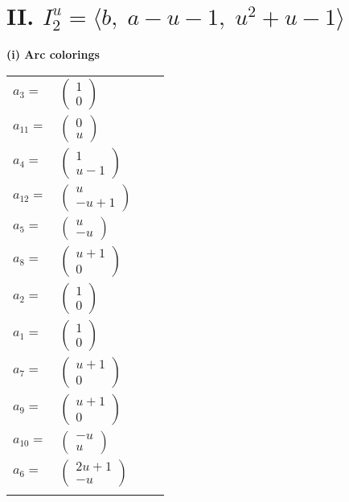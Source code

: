 \documentclass[1p]{elsarticle_modified}
\theoremstyle{definition}
\begin{document}
\centering \section*{II. $I^u_{2}= \langle b,\;a- u-1,\;u^2+u-1 \rangle$}
\flushleft \textbf{(i) Arc colorings}\\
\begin{tabular}{m{7pt} m{180pt} m{7pt} m{180pt} }
\flushright $a_{3}=$&$\begin{pmatrix}1\\0\end{pmatrix}$ \\
\flushright $a_{11}=$&$\begin{pmatrix}0\\u\end{pmatrix}$ \\
\flushright $a_{4}=$&$\begin{pmatrix}1\\u-1\end{pmatrix}$ \\
\flushright $a_{12}=$&$\begin{pmatrix}u\\- u+1\end{pmatrix}$ \\
\flushright $a_{5}=$&$\begin{pmatrix}u\\- u\end{pmatrix}$ \\
\flushright $a_{8}=$&$\begin{pmatrix}u+1\\0\end{pmatrix}$ \\
\flushright $a_{2}=$&$\begin{pmatrix}1\\0\end{pmatrix}$ \\
\flushright $a_{1}=$&$\begin{pmatrix}1\\0\end{pmatrix}$ \\
\flushright $a_{7}=$&$\begin{pmatrix}u+1\\0\end{pmatrix}$ \\
\flushright $a_{9}=$&$\begin{pmatrix}u+1\\0\end{pmatrix}$ \\
\flushright $a_{10}=$&$\begin{pmatrix}- u\\u\end{pmatrix}$ \\
\flushright $a_{6}=$&$\begin{pmatrix}2 u+1\\- u\end{pmatrix}$\\&\end{tabular}
\end{document}
